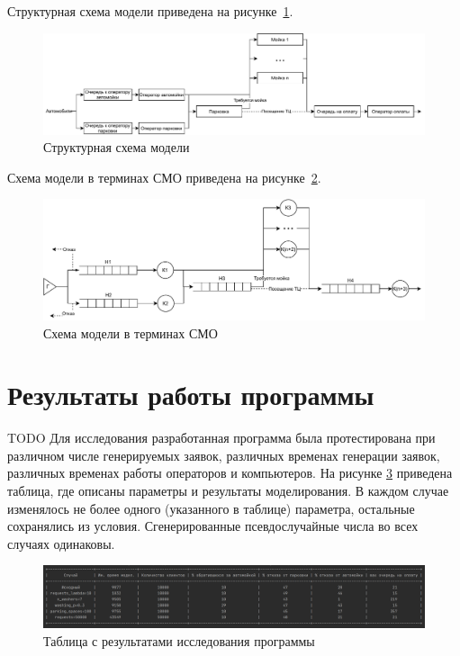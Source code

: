 \documentclass[14pt, a4paper]{extarticle}
\begin{document}
Структурная схема модели приведена на рисунке~\ref{pic:01}.
\begin{figure}[h]
	\begin{center}
		{\includegraphics[scale=0.8]{pictures/2-1.pdf}
			\caption{Структурная схема модели}
			\label{pic:01}}
	\end{center}
\end{figure}


Схема модели в терминах СМО приведена на рисунке~\ref{pic:02}.
\begin{figure}[h]
	\begin{center}
		{\includegraphics[scale=0.8]{pictures/2-2.pdf}
			\caption{Схема модели в терминах СМО}
			\label{pic:02}}
	\end{center}
\end{figure}

\section{Результаты работы программы}
TODO
Для исследования разработанная программа была протестирована при различном числе генерируемых заявок, различных временах генерации заявок, различных временах работы операторов и компьютеров. На рисунке \ref{pic:res} приведена таблица, где описаны параметры и результаты моделирования. В каждом случае изменялось не более одного (указанного в таблице) параметра, остальные сохранялись из условия. Сгенерированные псевдослучайные числа во всех случаях одинаковы. 

\begin{figure}[h]
	\begin{center}
		{\includegraphics[scale=0.55]{pictures/res.png}
			\caption{Таблица с результатами исследования программы}
			\label{pic:res}}
	\end{center}
\end{figure}
\end{document}
